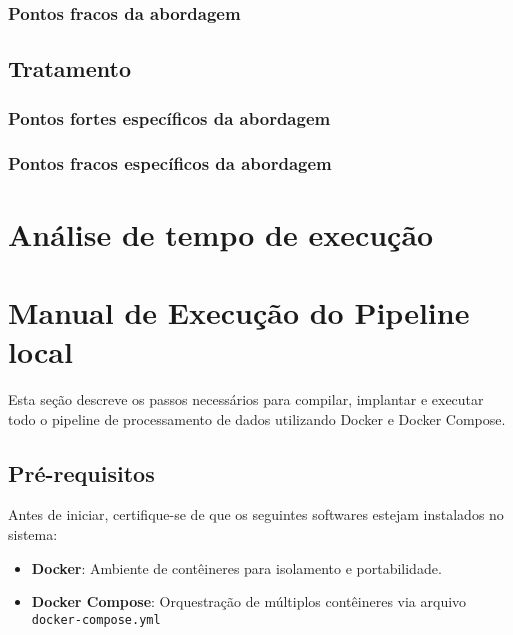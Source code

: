 \documentclass[a4paper,12pt]{article}
\begin{document}
\subsubsection*{Pontos fracos da abordagem}

\subsection*{Tratamento}

\subsubsection*{Pontos fortes específicos da abordagem}

\subsubsection*{Pontos fracos específicos da abordagem}

\section{Análise de tempo de execução}



\section{Manual de Execução do Pipeline local}

Esta seção descreve os passos necessários para compilar, implantar e executar todo o pipeline de processamento de dados utilizando Docker e Docker Compose.

\subsection*{Pré-requisitos}

Antes de iniciar, certifique-se de que os seguintes softwares estejam instalados no sistema:

\begin{itemize}
    \item \textbf{Docker}: Ambiente de contêineres para isolamento e portabilidade.
    \item \textbf{Docker Compose}: Orquestração de múltiplos contêineres via arquivo \texttt{docker-compose.yml}
\end{itemize}
\end{document}
